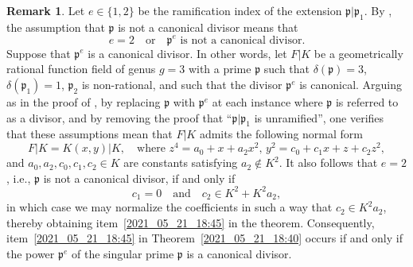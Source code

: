 \documentclass[12pt,reqno]{amsart}
\newcommand{\toda}[2][]{\todo[color=blue!30, #1]{#2}} %
\theoremstyle{definition}
\newtheorem{rem}[thm]{Remark}
\newcommand{\pp}{\mathfrak{p}}
\newcommand{\de}{\delta}
\newcommand{\ka}{\kappa}
\begin{document}
\begin{rem}\label{2024_05_10_00:15}
Let $e\in\{1,2\}$ be the ramification index of the extension $\pp|\pp_1$. 
By \cite[Lemma~3.2]{HiSt23},
the assumption that $\pp$ is not a canonical divisor means that
\[ e=2 \quad \text{or} \quad \text{$\pp^e$ is not a canonical divisor}. \]
Suppose that $\pp^e$ is a canonical divisor. In other words, let $F|K$ be a geometrically rational function field of genus $g=3$ with a prime $\pp$ such that $\de(\pp)=3$, $\de(\pp_1)=1$, $\pp_2$ is non-rational, and such that the divisor $\pp^e$ is canonical.
Arguing as in the proof of \cite[Theorem~3.1~(ii)]{HiSt23}, by replacing $\pp$ with $\pp^e$ at each instance where $\pp$ is referred to as a divisor, and by removing the proof that ``$\pp|\pp_1$ is unramified'', 
one verifies that these assumptions mean that $F|K$ admits the following normal form
\begin{equation*}
    F|K=K(x,y)|K, \quad \text{where }z^4 = a_0 + x + a_2 x^2, \, y^2 = c_0 + c_1 x + z + c_2 z^2,
\end{equation*}
and $a_0,a_2,c_0,c_1,c_2 \in K$ are constants satisfying $a_2 \notin K^2$.
It also follows that $e=2$, i.e., $\pp$ is not a canonical divisor, if and only if
\begin{equation*}
    c_1=0 \quad \text{and} \quad c_2 \in K^2 + K^2 a_2,
\end{equation*}
in which case
we may normalize the coefficients in such a way that $c_2\in K^2 a_2$, thereby obtaining item~\ref{2021_05_21_18:45} in the theorem.
Consequently, item~\ref{2021_05_21_18:45} in Theorem~\ref{2021_05_21_18:40} occurs if and only if the power $\pp^e$ of the singular prime $\pp$ is a canonical divisor.
\end{rem}
\end{document}
